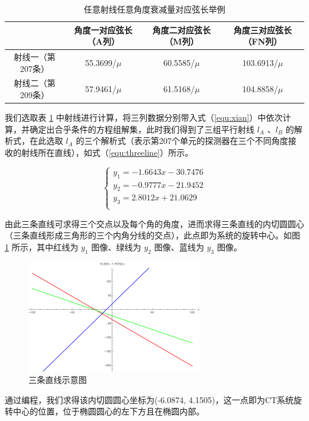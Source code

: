 \documentclass[UTF8]{ctexart}
\begin{document}
\begin{table}[htbp]
\centering
\caption{任意射线任意角度衰减量对应弦长举例}
\label{lineexp}
\begin{tabular}{cccc}
\toprule
  & 角度一对应弦长（A列） & 角度二对应弦长（M列） & 角度三对应弦长（FN列）  \\
\midrule
射线一（第207条） & 55.3699/$\mu$ & 60.5585/$\mu$ & 103.6913/$\mu$  \\
射线二（第209条） & 57.9461/$\mu$ & 61.5168/$\mu$ & 104.8858/$\mu$  \\
\bottomrule
\end{tabular}
\end{table}

我们选取表 \ref{lineexp} 中射线进行计算，将三列数据分别带入式（\ref{equ:xian}）中依次计算，并确定出合乎条件的方程组解集，此时我们得到了三组平行射线 $l_A$ 、$l_B$ 的解析式，在此选取 $l_A$ 的三个解析式（表示第207个单元的探测器在三个不同角度接收的射线所在直线），如式（\ref{equ:threeline}）所示。

\begin{equation}
\label{equ:threeline}
  \begin{cases}
    y_1=-1.6643x-30.7476  \\
    y_2=-0.9777x-21.9452  \\
    y_3=2.8012x+21.0629  \\
  \end{cases}
\end{equation}

由此三条直线可求得三个交点以及每个角的角度，进而求得三条直线的内切圆圆心（三条直线形成三角形的三个内角分线的交点），此点即为系统的旋转中心。如图 \ref{fig:threeline} 所示，其中红线为 $y_1$ 图像、绿线为 $y_2$ 图像、蓝线为 $y_3$ 图像。

\begin{figure}[htbp]
  \centering
  \includegraphics[width=3in]{../figure/threeline.png}
  \caption{三条直线示意图}
  \label{fig:threeline}
\end{figure}

通过编程，我们求得该内切圆圆心坐标为(-6.0874, 4.1505)，这一点即为CT系统旋转中心的位置，位于椭圆圆心的左下方且在椭圆内部。
\end{document}
